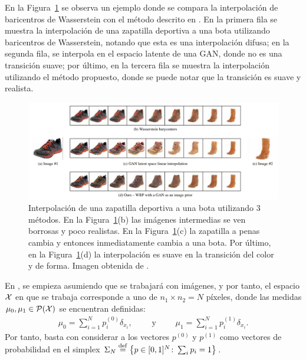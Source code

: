 

En la Figura~\ref{fig:interpolacion-wass-bar-gan} se observa un ejemplo donde se compara la interpolación de baricentros de Wasserstein con el método descrito en \cite{simon2020barycenters}.
En la primera fila se muestra la interpolación de una zapatilla deportiva a una bota utilizando baricentros de Wasserstein, notando que esta es una interpolación difusa; en la segunda fila, se interpola en el espacio latente de una GAN, donde no es una transición suave; por último, en la tercera fila se muestra la interpolación utilizando el método propuesto, donde se puede notar que la transición es suave y realista.
\begin{figure}[H]
    \centering
    \includegraphics[width=\textwidth]{img/cbw/interpolacion-wass-bar-gan.png}
    \caption{
        Interpolación de una zapatilla deportiva a una bota utilizando 3 métodos. En la Figura~\ref{fig:interpolacion-wass-bar-gan}(b) las imágenes intermedias se ven borrosas y poco realistas. En la Figura~\ref{fig:interpolacion-wass-bar-gan}(c) la zapatilla a penas cambia y entonces inmediatamente cambia a una bota. Por último, en la Figura~\ref{fig:interpolacion-wass-bar-gan}(d) la interpolación es suave en la transición del color y de forma. Imagen obtenida de \cite{simon2020barycenters}.
    }
    \label{fig:interpolacion-wass-bar-gan}
\end{figure}

En \cite{simon2020barycenters}, se empieza asumiendo que se trabajará con imágenes, y por tanto, el espacio $\cX$ en que se trabaja corresponde a uno de $n_1 \times n_2 = N$ píxeles, donde las medidas $\mu_0, \mu_1 \in \ProbSpace[\cX] $ se encuentran definidas:
\begin{align*}
    \mu_0 = \sum_{i=1}^{N} p^{(0)}_i \delta_{x_i},
    \qquad \text{ y } \qquad
    \mu_1 = \sum_{i=1}^{N} p^{(1)}_i \delta_{x_i}.
\end{align*}
Por tanto, basta con considerar a los vectores $p^{(0)}$ y $p^{(1)}$ como vectores de probabilidad en el simplex $\Simplex[N] \eqdef \left\{ p \in [0, 1]^{N} \colon \sum_i p_i = 1 \right\}$.

